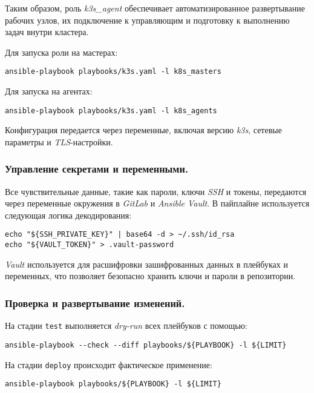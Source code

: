 Таким образом, роль \textit{k3s\_agent} обеспечивает автоматизированное развертывание рабочих узлов, их подключение к управляющим и подготовку к выполнению задач внутри кластера.

Для запуска роли на мастерах:

\begin{lstlisting}
ansible-playbook playbooks/k3s.yaml -l k8s_masters
\end{lstlisting}

Для запуска на агентах:

\begin{lstlisting}
ansible-playbook playbooks/k3s.yaml -l k8s_agents
\end{lstlisting}

Конфигурация передается через переменные, включая версию \textit{k3s}, сетевые параметры и \textit{TLS}-настройки.

\subsubsection{Управление секретами и переменными.} Все чувствительные данные, такие как пароли, ключи \textit{SSH} и токены, передаются через переменные окружения в \textit{GitLab} и \textit{Ansible Vault}. В пайплайне используется следующая логика декодирования:

\begin{lstlisting}
echo "${SSH_PRIVATE_KEY}" | base64 -d > ~/.ssh/id_rsa
echo "${VAULT_TOKEN}" > .vault-password
\end{lstlisting}

\textit{Vault} используется для расшифровки зашифрованных данных в плейбуках и переменных, что позволяет безопасно хранить ключи и пароли в репозитории.

\subsubsection{Проверка и развертывание изменений.} На стадии \lstinline{test} выполняется \textit{dry-run} всех плейбуков с помощью:

\begin{lstlisting}
ansible-playbook --check --diff playbooks/${PLAYBOOK} -l ${LIMIT}
\end{lstlisting}

На стадии \lstinline{deploy} происходит фактическое применение:

\begin{lstlisting}
ansible-playbook playbooks/${PLAYBOOK} -l ${LIMIT}
\end{lstlisting}

